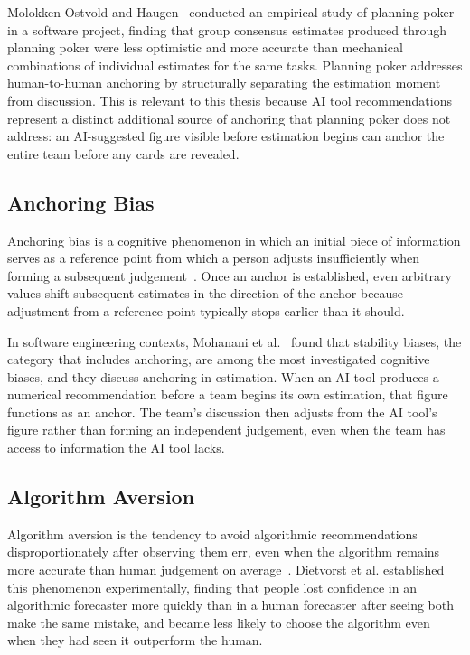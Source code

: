 \documentclass[a4paper,twoside]{bth}
\begin{document}
Molokken-Ostvold and Haugen~\cite{molokken2007combining} conducted an empirical study of planning poker in a software project, finding that group consensus estimates produced through planning poker were less optimistic and more accurate than mechanical combinations of individual estimates for the same tasks. Planning poker addresses human-to-human anchoring by structurally separating the estimation moment from discussion. This is relevant to this thesis because AI tool recommendations represent a distinct additional source of anchoring that planning poker does not address: an AI-suggested figure visible before estimation begins can anchor the entire team before any cards are revealed.

\subsection{Anchoring Bias}

Anchoring bias is a cognitive phenomenon in which an initial piece of information serves as a reference point from which a person adjusts insufficiently when forming a subsequent judgement~\cite[pp.~119--128]{kahneman2011thinking}. Once an anchor is established, even arbitrary values shift subsequent estimates in the direction of the anchor because adjustment from a reference point typically stops earlier than it should.

In software engineering contexts, Mohanani et al.~\cite{mohanani2018cognitive} found that stability biases, the category that includes anchoring, are among the most investigated cognitive biases, and they discuss anchoring in estimation. When an AI tool produces a numerical recommendation before a team begins its own estimation, that figure functions as an anchor. The team's discussion then adjusts from the AI tool's figure rather than forming an independent judgement, even when the team has access to information the AI tool lacks.

\subsection{Algorithm Aversion}

Algorithm aversion is the tendency to avoid algorithmic recommendations disproportionately after observing them err, even when the algorithm remains more accurate than human judgement on average~\cite{dietvorst2015algorithm}. Dietvorst et al. established this phenomenon experimentally, finding that people lost confidence in an algorithmic forecaster more quickly than in a human forecaster after seeing both make the same mistake, and became less likely to choose the algorithm even when they had seen it outperform the human.
\end{document}
